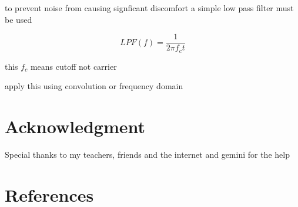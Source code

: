 \documentclass[conference]{IEEEtran}
\begin{document}
to prevent noise from causing signficant discomfort a simple low pass filter must be used

\begin{equation}
    LPF(f) = \frac{1}{2 \pi f_c t}
\end{equation}

this $f_c$ means cutoff not carrier


apply this using convolution or frequency domain

\section*{Acknowledgment}

Special thanks to my teachers, friends and the internet and gemini for the help

\section*{References}


\vspace{12pt}
\end{document}
